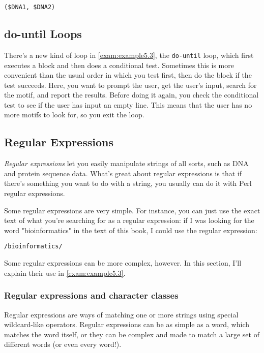 \begin{lstlisting}
($DNA1, $DNA2)
\end{lstlisting}

\subsection{do-until Loops}
There's a new kind of loop in \autoref{exam:example5.3}, the \verb|do-until| loop, which first executes a block and then does a conditional test. Sometimes this is more convenient than the usual order in which you test first, then do the block if the test succeeds. Here, you want to prompt the user, get the user's input, search for the motif, and report the results. Before doing it again, you check the conditional test to see if the user has input an empty line. This means that the user has no more motifs to look for, so you exit the loop. 

\subsection{Regular Expressions}
\textit{Regular expressions} let you easily manipulate strings of all sorts, such
as DNA and protein sequence data. What's great about regular expressions
is that if there's something you want to do with a string, you usually
can do it with Perl regular expressions.

Some regular expressions are very simple. For instance, you can just use
the exact text of what you're searching for as a regular expression: if
I was looking for the word "bioinformatics" in the text of this book, I
could use the regular expression:

\begin{lstlisting}
/bioinformatics/
\end{lstlisting}

Some regular expressions can be more complex, however. In this section, I'll explain their use in \autoref{exam:example5.3}. 

\subsubsection{Regular expressions and character classes}
Regular expressions are ways of matching one or more strings using special wildcard-like operators. Regular expressions can be as simple as a word, which matches the word itself, or they can be complex and made to match a large set of different words (or even every word!).

